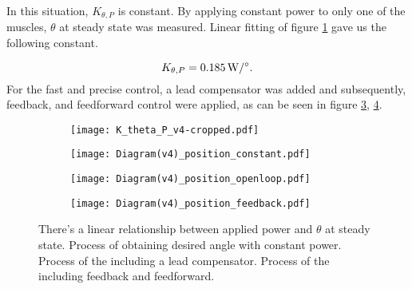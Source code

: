In this situation, $K_{\theta,P}$ is constant. By applying constant power to only one of the muscles, $\theta$ at steady state was measured. Linear fitting of figure \ref{KthetaP} gave us the following constant.

\begin{equation}
K_{\theta,P} = \SI{0.185}{\watt\per\degree}. \notag
\end{equation}
For the fast and precise control, a lead compensator was added and subsequently, feedback, and feedforward control were applied, as can be seen in figure \ref{position_open_loop}, \ref{position_closed_loop}.

\begin{figure}[t]
	\centering
	\begin{minipage}{0.30\textwidth}
		\begin{subfigure}{\linewidth}
			\centering
			\texttt{[image: K\_theta\_P\_v4-cropped.pdf]}
			\caption{\label{KthetaP}}
		\end{subfigure}
	\end{minipage}%
	\begin{minipage}{0.6\textwidth}
		\centering
		\begin{subfigure}{0.55\linewidth}
			\centering
			\texttt{[image: Diagram(v4)\_position\_constant.pdf]}
			\caption{\label{AntaControl_constant}}
		\end{subfigure}
		
		\begin{subfigure}{0.73\linewidth}
			\centering
			\texttt{[image: Diagram(v4)\_position\_openloop.pdf]}
			\caption{\label{position_open_loop}}
		\end{subfigure}
		
		\begin{subfigure}{\linewidth}
			\centering
			\texttt{[image: Diagram(v4)\_position\_feedback.pdf]}
			\caption{\label{position_closed_loop}}
		\end{subfigure}
	\end{minipage}
	\caption[Block diagrams for the \apc]{ There's a linear relationship between applied power and $\theta$ at steady state.  Process of obtaining desired angle with constant power.  Process of the \apc including a lead compensator.  Process of the \apc including feedback and feedforward.}
	\label{anta_position_diagrams}
\end{figure}


